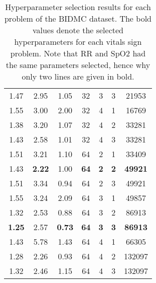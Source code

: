 \documentclass{article}
\begin{document}
\begin{table*}[t]
\begin{center}
\begin{tabular}{ccccccc}
        1.47 &      2.95 &      1.05 &         32 &                        3 &          3 &       21953 \\
        1.55 &      3.00 &      2.00 &         32 &                        4 &          1 &       16769 \\
        1.38 &      3.20 &      1.07 &         32 &                        4 &          2 &       33281 \\
        1.43 &      2.58 &      1.01 &         32 &                        4 &          3 &       33281 \\
        1.51 &      3.21 &      1.10 &         64 &                        2 &          1 &       33409 \\
        1.43 &     \textbf{2.22} & 1.00 &         \textbf{64} &                        \textbf{2} &          \textbf{2} &       \textbf{49921} \\
        1.51 &      3.34 &      0.94 &         64 &                        2 &          3 &       49921 \\
        1.55 &      3.24 &      2.09 &         64 &                        3 &          1 &       49857 \\
        1.32 &      2.53 &      0.88 &         64 &                        3 &          2 &       86913 \\
        \textbf{1.25} &      2.57 &      \textbf{0.73} &         \textbf{64} &                        \textbf{3} &         \textbf{3} &       \textbf{86913} \\
        1.43 &      5.78 &      1.43 &         64 &                        4 &          1 &       66305 \\
        1.28 &      2.26 &      0.93 &         64 &                        4 &          2 &      132097 \\
        1.32 &      2.46 &      1.15 &         64 &                        4 &          3 &      132097 \\
        \bottomrule
        \end{tabular}
    \end{center}
    \caption{Hyperparameter selection results for each problem of the BIDMC dataset. The bold values denote the selected hyperparameters for each vitals sign problem. Note that RR and SpO2 had the same parameters selected, hence why only two lines are given in bold.}
    \label{tab:bidmc_hyper}
\end{table*} 
\end{document}
